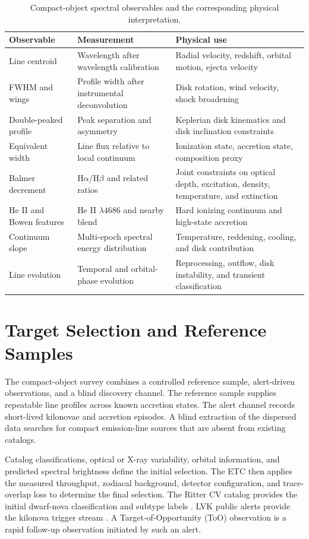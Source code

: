 \documentclass[10pt,onecolumn]{article}
\begin{document}
\begin{table}[H]
\centering
\caption{Compact-object spectral observables and the corresponding physical
interpretation.}
\label{tab:observables}
\begin{tabularx}{\textwidth}{@{}P{33mm}Y P{37mm}@{}}
\toprule
\textbf{Observable} & \textbf{Measurement} & \textbf{Physical use}\\
\midrule
Line centroid & Wavelength after wavelength calibration & Radial velocity,
redshift, orbital motion, ejecta velocity\\
FWHM and wings & Profile width after instrumental deconvolution & Disk
rotation, wind velocity, shock broadening\\
Double-peaked profile & Peak separation and asymmetry & Keplerian disk
kinematics and disk inclination constraints\\
Equivalent width & Line flux relative to local continuum & Ionization state,
accretion state, composition proxy\\
Balmer decrement & H$\alpha$/H$\beta$ and related ratios & Joint constraints
on optical depth, excitation, density, temperature, and extinction\\
He II and Bowen features & He II $\lambda4686$ and nearby blend & Hard
ionizing continuum and high-state accretion\\
Continuum slope & Multi-epoch spectral energy distribution & Temperature,
reddening, cooling, and disk contribution\\
Line evolution & Temporal and orbital-phase evolution & Reprocessing,
outflow, disk instability, and transient classification\\
\bottomrule
\end{tabularx}
\end{table}

\section{Target Selection and Reference Samples}

The compact-object survey combines a controlled reference sample,
alert-driven observations, and a blind discovery channel. The reference
sample supplies repeatable line profiles across known accretion states. The
alert channel records short-lived kilonovae and accretion episodes. A blind
extraction of the dispersed data searches for compact emission-line sources
that are absent from existing catalogs.

Catalog classifications, optical or X-ray variability, orbital information,
and predicted spectral brightness define the initial selection. The ETC then
applies the measured throughput, zodiacal background, detector configuration,
and trace-overlap loss to determine the final selection. The Ritter CV
catalog provides the initial dwarf-nova classification and subtype labels
\cite{rittercv}. LVK public alerts provide the kilonova trigger stream
\cite{lvkalerts}. A Target-of-Opportunity (ToO) observation is a rapid
follow-up observation initiated by such an alert.
\end{document}
